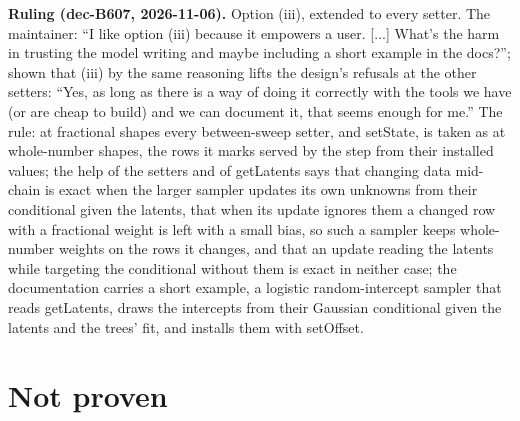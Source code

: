 \textbf{Ruling (dec-B607, 2026-11-06).} Option (iii), extended to every setter. The maintainer: ``I like option
(iii) because it empowers a user. [...] What's the harm in trusting the model writing and maybe including a short
example in the docs?''; shown that (iii) by the same reasoning lifts the design's refusals at the other setters:
``Yes, as long as there is a way of doing it correctly with the tools we have (or are cheap to build) and we can
document it, that seems enough for me.'' The rule: at fractional shapes every between-sweep setter, and setState,
is taken as at whole-number shapes, the rows it marks served by the step from their installed values; the help of
the setters and of getLatents says that changing data mid-chain is exact when the larger sampler updates its own
unknowns from their conditional given the latents, that when its update ignores them a changed row with a
fractional weight is left with a small bias, so such a sampler keeps whole-number weights on the rows it changes,
and that an update reading the latents while targeting the conditional without them is exact in neither case; the
documentation carries a short example, a logistic random-intercept sampler that reads getLatents, draws the
intercepts from their Gaussian conditional given the latents and the trees' fit, and installs them with
setOffset.

\section{Not proven}\label{sec:notproven}

